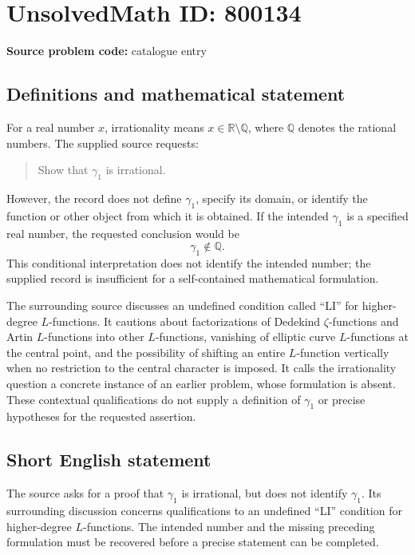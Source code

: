 \documentclass[11pt]{article}
\newcommand{\Q}{\mathbb{Q}}
\newcommand{\R}{\mathbb{R}}
\begin{document}
\section*{UnsolvedMath ID: 800134}
\textbf{Source problem code:} catalogue entry
\subsection{Definitions and mathematical statement}
For a real number \(x\), irrationality means \(x\in\R\setminus\Q\), where \(\Q\) denotes the rational numbers. The supplied source requests:
\begin{quote}
Show that \(\gamma_1\) is irrational.
\end{quote}
However, the record does not define \(\gamma_1\), specify its domain, or identify the function or other object from which it is obtained. If the intended \(\gamma_1\) is a specified real number, the requested conclusion would be
\[
\gamma_1\notin\Q.
\]
This conditional interpretation does not identify the intended number; the supplied record is insufficient for a self-contained mathematical formulation.

The surrounding source discusses an undefined condition called ``LI'' for higher-degree \(L\)-functions. It cautions about factorizations of Dedekind \(\zeta\)-functions and Artin \(L\)-functions into other \(L\)-functions, vanishing of elliptic curve \(L\)-functions at the central point, and the possibility of shifting an entire \(L\)-function vertically when no restriction to the central character is imposed. It calls the irrationality question a concrete instance of an earlier problem, whose formulation is absent. These contextual qualifications do not supply a definition of \(\gamma_1\) or precise hypotheses for the requested assertion.
\subsection{Short English statement}
The source asks for a proof that \(\gamma_1\) is irrational, but does not identify \(\gamma_1\). Its surrounding discussion concerns qualifications to an undefined ``LI'' condition for higher-degree \(L\)-functions. The intended number and the missing preceding formulation must be recovered before a precise statement can be completed.
\end{document}
